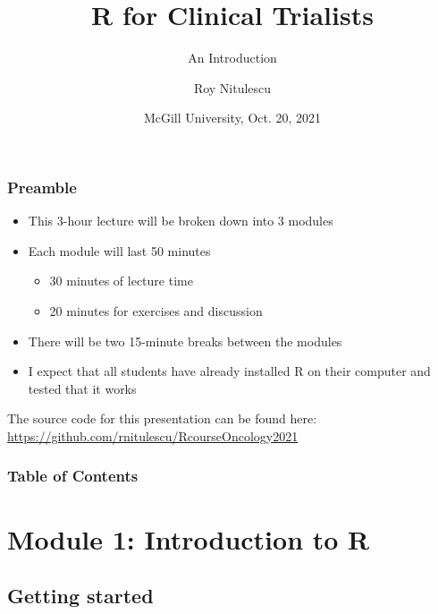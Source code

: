 \documentclass{beamer}
\title{R for Clinical Trialists}
\subtitle{An Introduction}
\author{Roy Nitulescu\inst{1}}
\institute
{
    \inst{1}%
    CITADEL\\
    CR-CHUM
}
\date[McGill, Oct. 20, 2021]{McGill University, Oct. 20, 2021}
\begin{document}

\frame{\titlepage}


\begin{frame}
    \frametitle{Preamble}
    \begin{itemize}
      \item This 3-hour lecture will be broken down into 3 modules
      \pause
      \item Each module will last 50 minutes
      \pause
      \begin{itemize}
        \item 30 minutes of lecture time
        \pause
        \item 20 minutes for exercises and discussion
        \pause
      \end{itemize}
      \item There will be two 15-minute breaks between the modules
      \pause
      \item I expect that all students have already installed R on their computer and tested that it works
    \end{itemize}
    
    \vfill
    
    \pause

    The source code for this presentation can be found here:\\
    \url{https://github.com/rnitulescu/RcourseOncology2021}
\end{frame}


\begin{frame}
    \frametitle{Table of Contents}
    \tableofcontents
\end{frame}



\section{Module 1: Introduction to R}

\subsection{Getting started}
\end{document}
